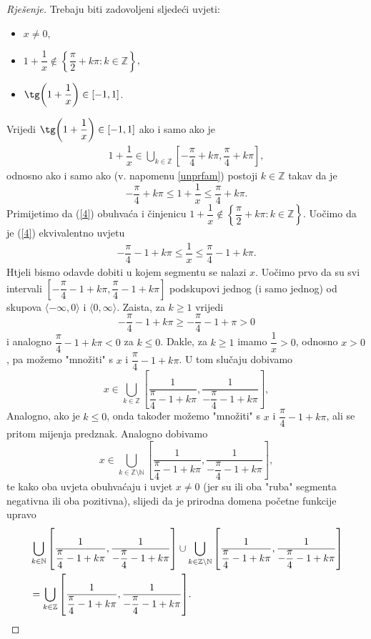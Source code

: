 \begin{proof}[Rješenje]
Trebaju biti zadovoljeni sljedeći uvjeti:
\begin{itemize}
\item $x\neq 0$,
\item $1+\dfrac{1}{x}\notin \left\{\dfrac{\pi}{2}+k\pi : k\in \mathbb{Z}\right\}$,
\item $\tg\left(1+\dfrac{1}{x}\right)\in [-1, 1]$.
\end{itemize}
Vrijedi $\tg\left(1+\dfrac{1}{x}\right)\in [-1, 1]$ ako i samo ako je
\begin{gather}
\label{4}
1+\dfrac{1}{x}\in \bigcup_{k\in \mathbb{Z}}{\left[-\dfrac{\pi}{4}+k\pi, \dfrac{\pi}{4}+k\pi\right]},
\end{gather}
odnosno ako i samo ako (v. napomenu \ref{unprfam}) postoji $k\in \mathbb{Z}$ takav da je
$$-\dfrac{\pi}{4}+k\pi\leq 1+\dfrac{1}{x} \leq \dfrac{\pi}{4}+k\pi.$$
Primijetimo da (\ref{4}) obuhvaća i činjenicu $1+\dfrac{1}{x}\notin \left\{\dfrac{\pi}{2}+k\pi : k\in \mathbb{Z}\right\}$. Uočimo da je (\ref{4}) ekvivalentno uvjetu
\begin{gather}
\label{5}
-\dfrac{\pi}{4}-1+k\pi\leq \dfrac{1}{x} \leq \dfrac{\pi}{4}-1+k\pi.
\end{gather}
Htjeli bismo odavde dobiti u kojem segmentu se nalazi $x$. Uočimo prvo da su svi intervali $\left[-\dfrac{\pi}{4}-1+k\pi, \dfrac{\pi}{4}-1+k\pi\right]$ podskupovi jednog (i samo jednog) od skupova $\langle -\infty, 0\rangle$ i $\langle 0, \infty\rangle$. Zaista, za $k\geq 1$ vrijedi
$$-\dfrac{\pi}{4}-1+k\pi\geq -\dfrac{\pi}{4}-1+\pi>0$$
i analogno $\dfrac{\pi}{4}-1+k\pi<0$ za $k\leq 0$. Dakle, za $k\geq 1$ imamo $\dfrac{1}{x}>0$, odnosno $x>0$, pa možemo "množiti" s $x$ i $\dfrac{\pi}{4}-1+k\pi$. U tom slučaju dobivamo
$$x\in \bigcup_{k\in \mathbb{Z}}{\left[\dfrac{1}{\dfrac{\pi}{4}-1+k\pi}, \dfrac{1}{-\dfrac{\pi}{4}-1+k\pi}\right]},$$
Analogno, ako je $k\leq 0$, onda također možemo "množiti" s  $x$ i $\dfrac{\pi}{4}-1+k\pi$, ali se pritom mijenja predznak. Analogno dobivamo
$$x\in \bigcup_{k\in \mathbb{Z}\setminus{\mathbb{N}}}{\left[\dfrac{1}{\dfrac{\pi}{4}-1+k\pi}, \dfrac{1}{-\dfrac{\pi}{4}-1+k\pi}\right]},$$
te kako oba uvjeta obuhvaćaju i uvjet $x\neq 0$ (jer su ili oba "ruba" segmenta negativna ili oba pozitivna), slijedi da je prirodna domena početne funkcije upravo 
\begin{align*}
&\bigcup_{k\in \mathbb{N}}{\left[\dfrac{1}{\dfrac{\pi}{4}-1+k\pi}, \dfrac{1}{-\dfrac{\pi}{4}-1+k\pi}\right]}\cup \bigcup_{k\in \mathbb{Z}\setminus{\mathbb{N}}}{\left[\dfrac{1}{\dfrac{\pi}{4}-1+k\pi}, \dfrac{1}{-\dfrac{\pi}{4}-1+k\pi}\right]}\\
&=\bigcup_{k\in \mathbb{Z}}{\left[\dfrac{1}{\dfrac{\pi}{4}-1+k\pi}, \dfrac{1}{-\dfrac{\pi}{4}-1+k\pi}\right]}.\qedhere
\end{align*}
\end{proof}

